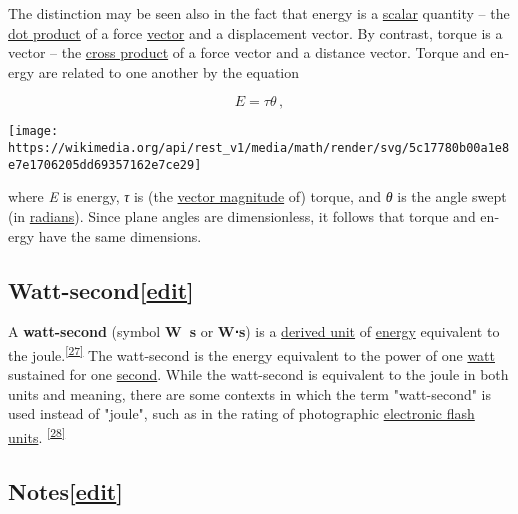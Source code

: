 \documentclass[
]{article}
\newenvironment{LTR}{\beginL}{\endL}
\begin{document}
\begin{LTR}
\begin{otherlanguage}{english}
The distinction may be seen also in the fact that energy is a
\href{/wiki/Scalar_(physics)}{scalar} quantity -- the
\href{/wiki/Dot_product}{dot product} of a force
\href{/wiki/Euclidean_vector}{vector} and a displacement vector. By
contrast, torque is a vector -- the \href{/wiki/Cross_product}{cross
product} of a force vector and a distance vector. Torque and energy are
related to one another by the equation

\[E = \tau\theta\,,\]

\texttt{[image: https://wikimedia.org/api/rest\_v1/media/math/render/svg/5c17780b00a1e8e7e1706205dd69357162e7ce29]}

where \emph{E} is energy, \emph{τ} is (the
\href{/wiki/Magnitude_(mathematics)\#Euclidean_vector_space}{vector
magnitude} of) torque, and \emph{θ} is the angle swept (in
\href{/wiki/Radian}{radians}). Since plane angles are dimensionless, it
follows that torque and energy have the same dimensions.

\subsection[{{{[}}\href{/w/index.php?title=Joule&action=edit&section=7}{{edit}}{{]}}}]{\texorpdfstring{\label{Watt-second}{Watt-second}{{{[}}\href{/w/index.php?title=Joule&action=edit&section=7}{{edit}}{{]}}}}{Watt-second{[}edit{]}}}\label{watt-secondedit}

A \textbf{watt-second} (symbol \textbf{W~s} or \textbf{W⋅s}) is a
\href{/wiki/Derived_unit}{derived unit} of \href{/wiki/Energy}{energy}
equivalent to the
joule.\textsuperscript{\hyperref[cite_note-28]{{[}27{]}}} The
watt-second is the energy equivalent to the power of one
\href{/wiki/Watt}{watt} sustained for one \href{/wiki/Second}{second}.
While the watt-second is equivalent to the joule in both units and
meaning, there are some contexts in which the term "watt-second" is used
instead of "joule", such as in the rating of photographic
\href{/wiki/Flash_(photography)}{electronic flash units}.
\textsuperscript{\hyperref[cite_note-29]{{[}28{]}}}

\subsection[{{{[}}\href{/w/index.php?title=Joule&action=edit&section=8}{{edit}}{{]}}}]{\texorpdfstring{\label{Notes}{Notes}{{{[}}\href{/w/index.php?title=Joule&action=edit&section=8}{{edit}}{{]}}}}{Notes{[}edit{]}}}\label{notesedit}


\end{otherlanguage}
\end{LTR}
\end{document}
